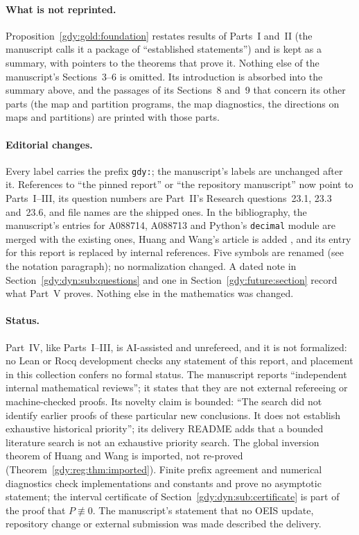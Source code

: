 \documentclass[11pt]{article}
\numberwithin{equation}{section}
\theoremstyle{definition}
\theoremstyle{remark}
\begin{document}
\paragraph{What is not reprinted.}
Proposition~\ref{gdy:gold:foundation} restates results of Parts~I and~II
(the manuscript calls it a package of ``established statements'') and is
kept as a summary, with pointers to the theorems that prove it. Nothing
else of the manuscript's Sections~3--6 is omitted. Its introduction is
absorbed into the summary above, and the passages of its Sections~8
and~9 that concern its other parts (the map and partition programs, the
map diagnostics, the directions on maps and partitions) are printed with
those parts.

\paragraph{Editorial changes.}
Every label carries the prefix \texttt{gdy:}; the manuscript's labels
are unchanged after it. References to ``the pinned report'' or ``the
repository manuscript'' now point to Parts~I--III, its question numbers
are Part~II's Research questions~23.1, 23.3 and~23.6, and file names are
the shipped ones. In the bibliography, the manuscript's entries for
A088714, A088713 and Python's \texttt{decimal} module are merged with
the existing ones, Huang and Wang's article is added \cite{huangwang},
and its entry for this report is replaced by internal references. Five
symbols are renamed (see the notation paragraph); no normalization
changed. A dated note in Section~\ref{gdy:dyn:sub:questions} and one in
Section~\ref{gdy:future:section} record what Part~V proves. Nothing else
in the mathematics was changed.

\paragraph{Status.}
Part~IV, like Parts~I--III, is AI-assisted and unrefereed, and it is not
formalized: no Lean or Rocq development checks any statement of this
report, and placement in this collection confers no formal status. The
manuscript reports ``independent internal mathematical reviews''; it
states that they are not external refereeing or machine-checked proofs.
Its novelty claim is bounded: ``The search did not identify earlier
proofs of these particular new conclusions. It does not establish
exhaustive historical priority''; its delivery README adds that a
bounded literature search is not an exhaustive priority search. The
global inversion theorem of Huang and Wang \cite[Propositions
3.1--3.2]{huangwang} is imported, not re-proved
(Theorem~\ref{gdy:reg:thm:imported}). Finite prefix agreement and
numerical diagnostics check implementations and constants and prove no
asymptotic statement; the interval certificate of
Section~\ref{gdy:dyn:sub:certificate} is part of the proof that
$P\not\equiv0$. The manuscript's statement that no OEIS update,
repository change or external submission was made described the
delivery.
\end{document}
